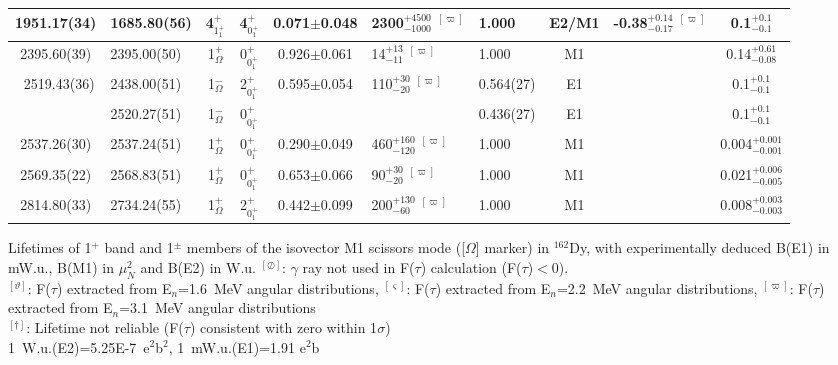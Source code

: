 \begin{landscape}
\begin{center}
\begin{longtable}{clcccllccc}
 1951.17(34)&  1685.80(56)               & 4$^+_{1^+_1}$ & 4$^+_{0^+_1}$      &0.071$\pm$0.048& 2300$^{+4500}_{-1000}$ $^{[\varpi]}$       &1.000                & E2/M1  & -0.38$^{+0.14}_{-0.17}$ $^{[\varpi]}$  & 0.1$^{+0.1}_{-0.1}$        \\ \hline
 2395.60(39)& 2395.00(50) & 1$^+_{\Omega}$         & 0$^+_{0^+_1}$ &0.926$\pm$0.061& 14$^{+13}_{-11}$        $^{[\varpi]}$               &1.000                & M1    &                                          & 0.14$^{+0.61}_{-0.08}$    \\ \
 2519.43(36)& 2438.00(51) & 1$^-_{\Omega}$         & 2$^+_{0^+_1}$ &0.595$\pm$0.054& 110$^{+30}_{-20}$       $^{[\varpi]}$               &0.564(27)            & E1    &                                          & 0.1$^{+0.1}_{-0.1}$         \\
            & 2520.27(51) & 1$^-_{\Omega}$         & 0$^+_{0^+_1}$ &&                                                                     &0.436(27)            & E1    &                                          & 0.1$^{+0.1}_{-0.1}$         \\ 
 2537.26(30)& 2537.24(51) & 1$^+_{\Omega}$         & 0$^+_{0^+_1}$ &0.290$\pm$0.049& 460$^{+160}_{-120}$     $^{[\varpi]}$               &1.000                & M1    &                                          & 0.004$^{+0.001}_{-0.001}$   \\ 
 2569.35(22)& 2568.83(51) & 1$^+_{\Omega}$         & 0$^+_{0^+_1}$ &0.653$\pm$0.066& 90$^{+30}_{-20}$        $^{[\varpi]}$               &1.000                & M1    &                                          & 0.021$^{+0.006}_{-0.005}$ \\
 2814.80(33)& 2734.24(55) & 1$^+_{\Omega}$         & 2$^+_{0^+_1}$ &0.442$\pm$0.099& 200$^{+130}_{-60}$      $^{[\varpi]}$               &1.000                & M1    &                                          & 0.008$^{+0.003}_{-0.003}$ \\ \hline

\end{longtable}
\end{center}  
Lifetimes of 1$^+$ band and 1$^\pm$ members of the isovector M1 scissors mode ([$\Omega$] marker) in $^{162}$Dy, with experimentally deduced B(E1) in mW.u., B(M1) in $\mu_N^2$ and B(E2) in W.u.
{\small $^{[\oslash]}$: $\gamma$ ray not used in F($\tau$) calculation (F($\tau$)$<$0).}\\
{\small $^{[\vartheta]}$: F($\tau$) extracted from E$_n$=1.6~MeV angular distributions},
{\small $^{[\varsigma]}$: F($\tau$) extracted from E$_n$=2.2~MeV angular distributions},
{\small $^{[\varpi]}$: F($\tau$) extracted from E$_n$=3.1~MeV angular distributions}\\
{\small $^{[\dagger]}$: Lifetime not reliable (F($\tau$) consistent with zero within 1$\sigma$)}\\
{\small 1~W.u.(E2)=5.25E-7~e$^2$b$^2$, 1~mW.u.(E1)=1.91 e$^2$b}
\end{landscape}


